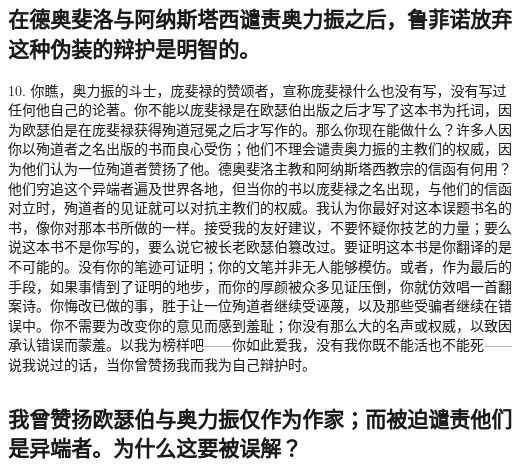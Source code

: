 
\subsection{在德奥斐洛与阿纳斯塔西谴责奥力振之后，鲁菲诺放弃这种伪装的辩护是明智的。}

10. 你瞧，奥力振的斗士，庞斐禄的赞颂者，宣称庞斐禄什么也没有写，没有写过任何他自己的论著。你不能以庞斐禄是在欧瑟伯出版之后才写了这本书为托词，因为欧瑟伯是在庞斐禄获得殉道冠冕之后才写作的。那么你现在能做什么？许多人因你以殉道者之名出版的书而良心受伤；他们不理会谴责奥力振的主教们的权威，因为他们认为一位殉道者赞扬了他。德奥斐洛主教和阿纳斯塔西教宗的信函有何用？他们穷追这个异端者遍及世界各地，但当你的书以庞斐禄之名出现，与他们的信函对立时，殉道者的见证就可以对抗主教们的权威。我认为你最好对这本误题书名的书，像你对那本书所做的一样。接受我的友好建议，不要怀疑你技艺的力量；要么说这本书不是你写的，要么说它被长老欧瑟伯篡改过。要证明这本书是你翻译的是不可能的。没有你的笔迹可证明；你的文笔并非无人能够模仿。或者，作为最后的手段，如果事情到了证明的地步，而你的厚颜被众多见证压倒，你就仿效唱一首翻案诗。你悔改已做的事，胜于让一位殉道者继续受诬蔑，以及那些受骗者继续在错误中。你不需要为改变你的意见而感到羞耻；你没有那么大的名声或权威，以致因承认错误而蒙羞。以我为榜样吧——你如此爱我，没有我你既不能活也不能死——说我说过的话，当你曾赞扬我而我为自己辩护时。\par


\subsection{我曾赞扬欧瑟伯与奥力振仅作为作家；而被迫谴责他们是异端者。为什么这要被误解？}

